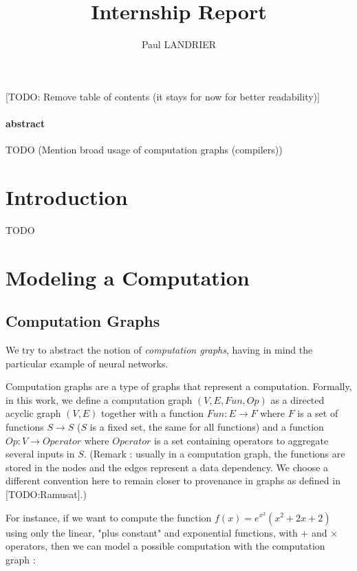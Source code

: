 \documentclass[11pt,a4paper]{article}
\author{Paul LANDRIER}
\title{Internship Report}
\date{}
\theoremstyle{definition}
\begin{document}
\maketitle

\tableofcontents

[TODO: Remove table of contents (it stays for now for better readability)]

\paragraph{abstract} TODO (Mention broad usage of computation graphs (compilers))


\section{Introduction}

TODO

\section{Modeling a Computation}

\subsection{Computation Graphs}

We try to abstract the notion of \textit{computation graphs}, having in mind the particular example of neural networks.

	Computation graphs are a type of graphs that represent a computation. Formally, in this work, we define a computation graph $(V,E,Fun,Op)$ as a directed acyclic graph $(V,E)$ together with a function $Fun:E \to F$ where $F$ is a set of functions $S \to S$ ($S$ is a fixed set, the same for all functions) and a function $Op:V \to Operator$ where $Operator$ is a set containing operators to aggregate several inputs in $S$. (Remark : usually in a computation graph, the functions are stored in the nodes and the edges represent a data dependency. We choose a different convention here to remain closer to provenance in graphs as defined in [TODO:Ramusat].)
	
	For instance, if we want to compute the function $f(x)=e^{x^2}(x^2 + 2x + 2)$ using only the linear, "plus constant" and exponential functions, with $+$ and $\times$ operators, then we can model a possible computation with the computation graph :
	
\end{document}
